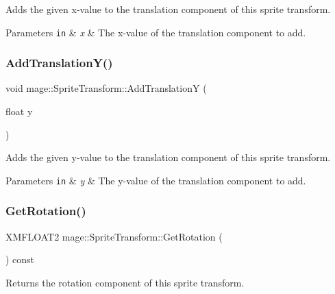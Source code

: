 Adds the given x-\/value to the translation component of this sprite transform.


\begin{DoxyParams}[1]{Parameters}
\mbox{\tt in}  & {\em x} & The x-\/value of the translation component to add. \\
\hline
\end{DoxyParams}
\hypertarget{structmage_1_1_sprite_transform_ad3d94aefc790ec25ba67563fbc8b8dab}{}\label{structmage_1_1_sprite_transform_ad3d94aefc790ec25ba67563fbc8b8dab} 
\subsubsection{\texorpdfstring{Add\+Translation\+Y()}{AddTranslationY()}}
{\footnotesize\ttfamily void mage\+::\+Sprite\+Transform\+::\+Add\+TranslationY (\begin{DoxyParamCaption}\item[{float}]{y }\end{DoxyParamCaption})}

Adds the given y-\/value to the translation component of this sprite transform.


\begin{DoxyParams}[1]{Parameters}
\mbox{\tt in}  & {\em y} & The y-\/value of the translation component to add. \\
\hline
\end{DoxyParams}
\hypertarget{structmage_1_1_sprite_transform_a920ceef57a62d4835b907dd2c910f15b}{}\label{structmage_1_1_sprite_transform_a920ceef57a62d4835b907dd2c910f15b} 
\subsubsection{\texorpdfstring{Get\+Rotation()}{GetRotation()}}
{\footnotesize\ttfamily X\+M\+F\+L\+O\+A\+T2 mage\+::\+Sprite\+Transform\+::\+Get\+Rotation (\begin{DoxyParamCaption}{ }\end{DoxyParamCaption}) const}

Returns the rotation component of this sprite transform.

